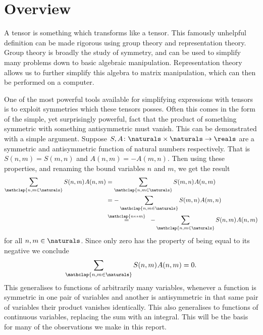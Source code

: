 \documentclass[fleqn]{NotesClass}
\begin{document}
    \section{Overview}\label{sec:overview}
    A tensor is something which transforms like a tensor.
    This famously unhelpful definition can be made rigorous using group theory and representation theory.
    Group theory is broadly the study of symmetry, and can be used to simplify many problems down to basic algebraic manipulation.
    Representation theory allows us to further simplify this algebra to matrix manipulation, which can then be performed on a computer.
    
    One of the most powerful tools available for simplifying expressions with tensors is to exploit symmetries which these tensors posses.
    Often this comes in the form of the simple, yet surprisingly powerful, fact that the product of something symmetric with something antisymmetric must vanish.
    This can be demonstrated with a simple argument.
    Suppose \(S, A \colon \naturals \times \naturals \to \reals\) are a symmetric and antisymmetric function of natural numbers respectively.
    That is \(S(n, m) = S(m, n)\) and \(A(n, m) = -A(m, n)\).
    Then using these properties, and renaming the bound variables \(n\) and \(m\), we get the result
    \begin{alignat}{3}
        \sum_{\mathclap{n, m \in \naturals}} S(n, m)\mkern1muA(n, m) &= \sum_{\mathclap{n, m \in \naturals}} S(m, n)\mkern1muA(n, m)\\
        &= -\sum_{\mathclap{n, m \in \naturals}} S(m, n)\mkern1muA(m, n)\\
        &\overset{\mathclap{n \leftrightarrow m}}{=} \mkern10mu -\sum_{\mathclap{n, m \in \naturals}} S(n, m)\mkern1muA(n, m)
    \end{alignat}
    for all \(n, m \in \naturals\).
    Since only zero has the property of being equal to its negative we conclude
    \begin{equation}
        \sum_{\mathclap{n,m\in\naturals}} S(n, m)\mkern1mu A(n, m) = 0.
    \end{equation}
    This generalises to functions of arbitrarily many variables, whenever a function is symmetric in one pair of variables and another is antisymmetric in that same pair of variables their product vanishes identically.
    This also generalises to functions of continuous variables, replacing the sum with an integral.
    This will be the basis for many of the observations we make in this report.
    
\end{document}

